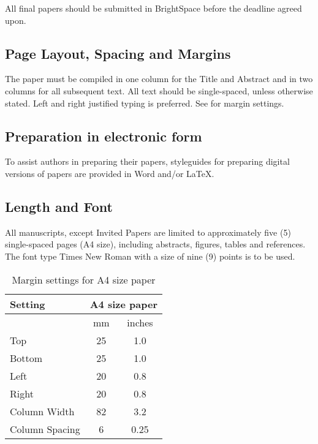 \documentclass{isprs} %
\begin{document}
All final papers should be submitted in BrightSpace before the deadline agreed upon.

\newpage            
\subsection{Page Layout, Spacing and Margins}\label{sec:Page Layout, Spacing and Margins}

The paper must be compiled in one column for the Title and Abstract and in two columns for all subsequent text. 
All text should be single-spaced, unless otherwise stated. Left and right justified typing is preferred. See  for margin settings.


\subsection{Preparation in electronic form}\label{sec:Preparation in electronic form}

To assist authors in preparing their papers, styleguides for preparing digital versions of papers are 
provided in Word and/or LaTeX.



\subsection{Length and Font}\label{sec:Length and Font}

All manuscripts, except Invited Papers are limited to approximately five (5) single-spaced 
pages (A4 size), including abstracts, figures, tables and references. The font type Times New Roman with a size of nine (9) points is to be used.

\begin{table}[h]
	\centering
	\caption{Margin settings for A4 size paper}
		\begin{tabular}{|l|c|c|}\hline
			Setting&\multicolumn{2}{c|}{A4 size paper}\\\hline
			  &mm&inches\\
			 Top&25&1.0\\
			 Bottom&25&1.0\\
			 Left&20&0.8\\
			 Right&20&0.8\\
			 Column Width&82&3.2\\
			 Column Spacing&6&0.25\\\hline
		\end{tabular}
\label{tab:Margin_settings}
\end{table}
\end{document}
